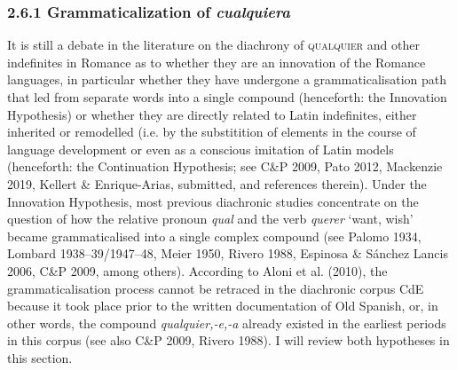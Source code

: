 \subsubsection[2.6.1 Grammaticalization of cualquiera ]{\textbf{2.6.1 Grammaticalization of }\textbf{\textit{cualquiera}}\textbf{ }}
\begin{styleStandard}
It is still a debate in the literature on the diachrony of \textsc{qualquier} and other indefinites in Romance as to whether they are an innovation of the Romance languages, in particular whether they have undergone a grammaticalisation path that led from separate words into a single compound (henceforth: the Innovation Hypothesis) or whether they are directly related to Latin indefinites, either inherited or remodelled (i.e. by the substitition of elements in the course of language development or even as a conscious imitation of Latin models (henceforth: the Continuation Hypothesis; see C\&P 2009, Pato 2012, Mackenzie 2019, Kellert \& Enrique-Arias, submitted, and references therein). Under the Innovation Hypothesis, most previous diachronic studies concentrate on the question of how the relative pronoun \textit{qual} and the verb \textit{querer} ‘want, wish’ became grammaticalised into a single complex compound (see Palomo 1934, Lombard 1938–39/1947–48, Meier 1950, Rivero 1988, Espinosa \& Sánchez Lancis 2006, C\&P 2009, among others). According to Aloni et al. (2010), the grammaticalisation process cannot be retraced in the diachronic corpus CdE because it took place prior to the written documentation of Old Spanish, or, in other words, the compound \textit{qualquier,\nobreakdash-e,\nobreakdash-a} already existed in the earliest periods in this corpus (see also C\&P 2009, Rivero 1988). I will review both hypotheses in this section.
\end{styleStandard}

